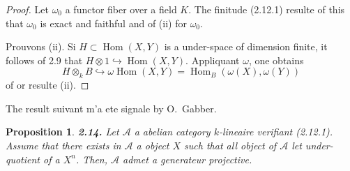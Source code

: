 \documentclass[12pt,a4paper]{article}
\theoremstyle{plain}
\newtheorem{proposition}[theorem]{Proposition}
\theoremstyle{definition}
\theoremstyle{remark}
\DeclareMathOperator{\Hom}{Hom}
\begin{document}
\begin{proof}
Let $\omega_0$ a functor fiber over a field $K$. The finitude (2.12.1) resulte of this that $\omega_0$ is exact and faithful and of (ii) for $\omega_0$.

Prouvons (ii). Si $H \subset \Hom(X,Y)$ is a under-space of dimension finite, it follows of 2.9 that $H \otimes 1 \hookrightarrow \Hom(X,Y)$. Appliquant $\omega$, one obtains
\[
H \otimes_k B \hookrightarrow \omega \Hom(X,Y) = \Hom_B(\omega(X), \omega(Y))
\]
of or resulte (ii).
\end{proof}

The result suivant m'a ete signale by O.~Gabber.

\begin{proposition}\label{prop:2.14}
\textbf{2.14.} Let $\mathcal{A}$ a abelian category $k$-lineaire verifiant (2.12.1). Assume that there exists in $\mathcal{A}$ a object $X$ such that all object of $\mathcal{A}$ let under-quotient of a $X^n$. Then, $\mathcal{A}$ admet a generateur projective.
\end{proposition}
\end{document}

